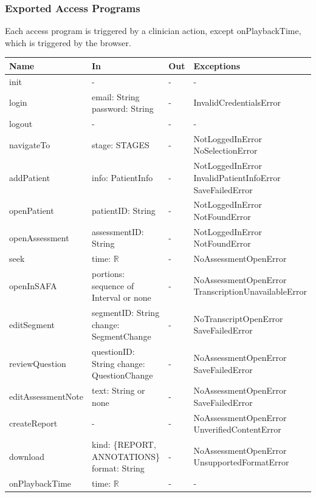 \documentclass[12pt, titlepage]{article}
\begin{document}
\subsubsection{Exported Access Programs}
Each access program is triggered by a clinician action, except onPlaybackTime, which is triggered by the browser.
{\small
\begin{longtable}{>{\raggedright\arraybackslash}p{3.4cm} >{\raggedright\arraybackslash}p{4.3cm} >{\raggedright\arraybackslash}p{3.2cm} >{\raggedright\arraybackslash}p{4.3cm}}
\hline
\textbf{Name} & \textbf{In} & \textbf{Out} & \textbf{Exceptions} \\
\hline
\endhead
init & - & - & - \\[4pt]
login & email: String \newline password: String & - & InvalidCredentialsError \\[4pt]
logout & - & - & - \\[4pt]
navigateTo & stage: STAGES & - & NotLoggedInError \newline NoSelectionError \\[4pt]
addPatient & info: PatientInfo & - & NotLoggedInError \newline InvalidPatientInfoError \newline SaveFailedError \\[4pt]
openPatient & patientID: String & - & NotLoggedInError \newline NotFoundError \\[4pt]
openAssessment & assessmentID: String & - & NotLoggedInError \newline NotFoundError \\[4pt]
seek & time: $\mathbb{R}$ & - & NoAssessmentOpenError \\[4pt]
openInSAFA & portions: sequence of Interval or none & - & NoAssessmentOpenError \newline TranscriptionUnavailableError \\[4pt]
editSegment & segmentID: String \newline change: SegmentChange & - & NoTranscriptOpenError \newline SaveFailedError \\[4pt]
reviewQuestion & questionID: String \newline change: QuestionChange & - & NoAssessmentOpenError \newline SaveFailedError \\[4pt]
editAssessmentNote & text: String or none & - & NoAssessmentOpenError \newline SaveFailedError \\[4pt]
createReport & - & - & NoAssessmentOpenError \newline UnverifiedContentError \\[4pt]
download & kind: \{REPORT, ANNOTATIONS\} \newline format: String & - & NoAssessmentOpenError \newline UnsupportedFormatError \\[4pt]
onPlaybackTime & time: $\mathbb{R}$ & - & - \\[4pt]
\hline
\end{longtable}
}
\end{document}

